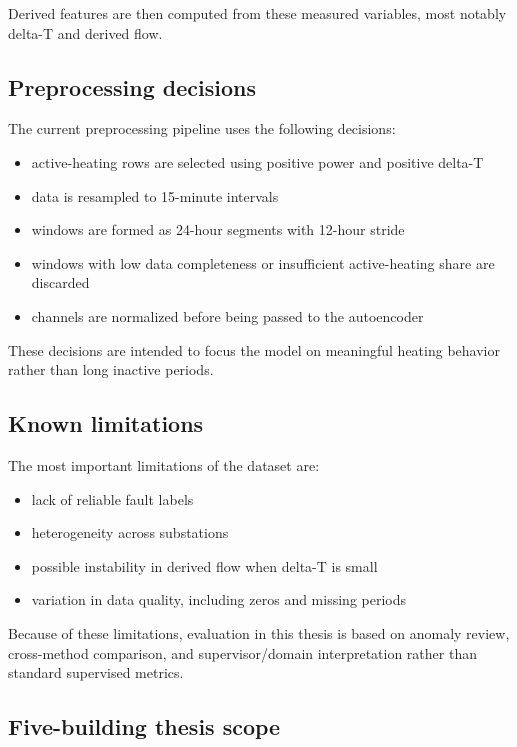 Derived features are then computed from these measured variables, most notably delta-T and derived flow.

\subsection{Preprocessing decisions}

The current preprocessing pipeline uses the following decisions:

\begin{itemize}
\item active-heating rows are selected using positive power and positive delta-T
\item data is resampled to 15-minute intervals
\item windows are formed as 24-hour segments with 12-hour stride
\item windows with low data completeness or insufficient active-heating share are discarded
\item channels are normalized before being passed to the autoencoder
\end{itemize}

These decisions are intended to focus the model on meaningful heating behavior rather than long inactive periods.

\subsection{Known limitations}

The most important limitations of the dataset are:

\begin{itemize}
\item lack of reliable fault labels
\item heterogeneity across substations
\item possible instability in derived flow when delta-T is small
\item variation in data quality, including zeros and missing periods
\end{itemize}

Because of these limitations, evaluation in this thesis is based on anomaly review, cross-method comparison, and supervisor/domain interpretation rather than standard supervised metrics.

\subsection{Five-building thesis scope}


